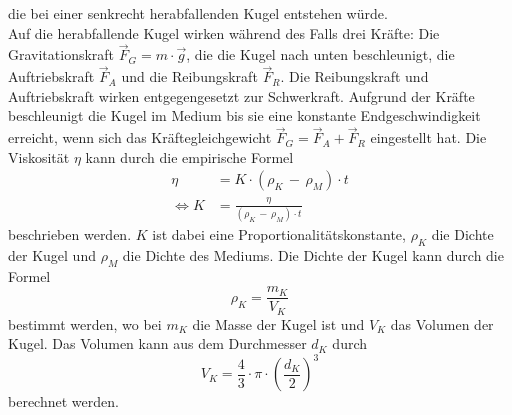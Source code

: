             \FloatBarrier die bei einer senkrecht herabfallenden Kugel entstehen würde. \\
            Auf die herabfallende Kugel wirken
            während des Falls drei Kräfte: Die Gravitationskraft $\vec{F}_{G} = m \cdot \vec{g}$, 
            die die Kugel nach unten beschleunigt, die Auftriebskraft $\vec{F}_{A}$ und die 
            Reibungskraft $\vec{F}_{R}$. Die Reibungskraft und Auftriebskraft wirken entgegengesetzt zur Schwerkraft. 
            Aufgrund der Kräfte beschleunigt
            die Kugel im Medium bis sie eine konstante Endgeschwindigkeit erreicht, wenn sich das Kräftegleichgewicht 
            $\vec{F}_{G} = \vec{F}_{A} + \vec{F}_{R}$ eingestellt hat.
            Die Viskosität $\eta$ kann durch die empirische Formel  
            \begin{align}
                \eta &= K \cdot \left( \rho_{K}\,-\,\rho_{M} \right) \cdot t \label{eqn:EmpirischeEtaFunktion} \\
                \Leftrightarrow K &= \frac{\eta}{ \left( \rho_{K}\,-\,\rho_{M} \right) \cdot t }
                \label{eqn:KFunktion}
            \end{align} 
            beschrieben werden. $K$ ist dabei eine Proportionalitätskonstante, $\rho_{K}$ die Dichte der Kugel und $\rho_{M}$
            die Dichte des Mediums. Die Dichte der Kugel kann durch die Formel 
            \begin{equation}
                \rho_{K} = \frac{m_{K}}{V_{K}}
                \label{eqn:DichtefunktionKugel}
            \end{equation}
            bestimmt werden, wo bei $m_{K}$ die Masse der Kugel ist und $V_{K}$ das Volumen der Kugel.
            Das Volumen kann aus dem Durchmesser $d_{K}$ durch
            \begin{equation}
                V_{K} = \frac{4}{3} \cdot \pi \cdot \left( \frac{d_{K}}{2} \right)^3
                \label{eqn:VolumenKugel}
            \end{equation} 
            berechnet werden.
            \FloatBarrier 
    \FloatBarrier
